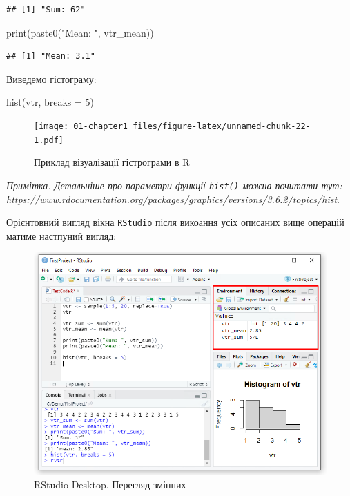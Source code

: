 \documentclass[
]{book}
\newenvironment{Shaded}{\begin{snugshade}}{\end{snugshade}}
\newcommand{\AttributeTok}[1]{\textcolor[rgb]{0.77,0.63,0.00}{#1}}
\newcommand{\DecValTok}[1]{\textcolor[rgb]{0.00,0.00,0.81}{#1}}
\newcommand{\FunctionTok}[1]{\textcolor[rgb]{0.00,0.00,0.00}{#1}}
\newcommand{\NormalTok}[1]{#1}
\newcommand{\StringTok}[1]{\textcolor[rgb]{0.31,0.60,0.02}{#1}}
\begin{document}
\begin{verbatim}
## [1] "Sum: 62"
\end{verbatim}

\begin{Shaded}
\begin{Highlighting}[]
\FunctionTok{print}\NormalTok{(}\FunctionTok{paste0}\NormalTok{(}\StringTok{"Mean: "}\NormalTok{, vtr\_mean))}
\end{Highlighting}
\end{Shaded}

\begin{verbatim}
## [1] "Mean: 3.1"
\end{verbatim}

Виведемо гістограму:

\begin{Shaded}
\begin{Highlighting}[]
\FunctionTok{hist}\NormalTok{(vtr, }\AttributeTok{breaks =} \DecValTok{5}\NormalTok{)}
\end{Highlighting}
\end{Shaded}

\begin{figure}
\centering
\texttt{[image: 01-chapter1\_files/figure-latex/unnamed-chunk-22-1.pdf]}
\caption{\label{fig:unnamed-chunk-22}Приклад візуалізації гістрограми в R}
\end{figure}

\emph{Примітка. Детальніше про параметри функції \texttt{hist()} можна почитати тут: \url{https://www.rdocumentation.org/packages/graphics/versions/3.6.2/topics/hist}}.

Орієнтовний вигляд вікна \texttt{RStudio} після викоання усіх описаних вище операцій матиме настпуний вигляд:

\begin{figure}
\centering
\includegraphics{images/chapter1/rstudio_10.png}
\caption{\label{fig:unnamed-chunk-23}RStudio Desktop. Перегляд змінних}
\end{figure}
\end{document}
